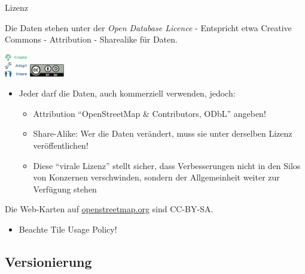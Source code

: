 \documentclass{beamer}
\begin{document}
\begin{frame}{Lizenz}

  Die Daten stehen unter der \emph{Open Database Licence} - Entspricht etwa Creative Commons - Attribution - Sharealike für Daten.

 \begin{center}
 \includegraphics[width=1cm]{ODbL.png}
 \hspace{2cm}
 \includegraphics[width=1.5cm]{cc-by-sa.pdf}
 \end{center}

\pause

\vspace*{-0.3cm}

\begin{itemize}
  \item Jeder darf die Daten, auch kommerziell verwenden, jedoch:
  \begin{itemize}
    \item Attribution "`OpenStreetMap \& Contributors, ODbL"' angeben!
    \item Share-Alike: Wer die Daten verändert, muss sie unter derselben Lizenz veröffentlichen!
    \item Diese "`virale Lizenz"' stellt sicher, dass Verbesserungen nicht in den Silos von Konzernen verschwinden, sondern der Allgemeinheit weiter zur Verfügung stehen
  \end{itemize}

\end{itemize}


\pause
Die Web-Karten auf \href{http://osm.org}{openstreetmap.org} sind CC-BY-SA.
\begin{itemize}
  \item Beachte Tile Usage Policy!
\end{itemize}

\end{frame}

\subsection{Versionierung}
\end{document}

